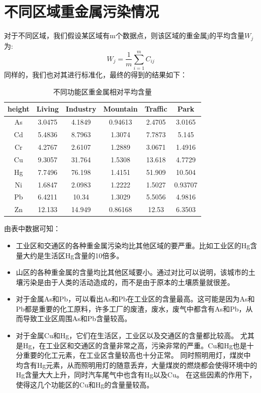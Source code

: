 \documentclass[a4paper]{article}
\begin{document}
\section{不同区域重金属污染情况}
对于不同区域，我们假设某区域有m个数据点，则该区域的重金属j的平均含量$W_j$为:
\begin{equation}
W_j=\frac{1}{m}\sum_{i=1}^m C_{ij}
\end{equation}
\indent 同样的，我们也对其进行标准化，最终的得到的结果如下：
\begin{table}[H]
		\centering
		\caption{不同功能区重金属相对平均含量}
		\label{average-contend}
		\begin{tabular}{c|ccccc}
		\hline
			height	  &    Living  &  Industry  &  Mountain  &  Traffic  &   Park    \\
			\hline
			As   & 3.0475  &  4.1849   &   0.94613   &  2.4705   &   3.0165      \\
    			Cd   & 5.4836  &  8.7963   &    1.3074   &  7.7873   &    5.145		\\
    			Cr   & 4.2767  &  2.6107   &    1.2889   &  3.0671   &   1.4916		\\
    			Cu   & 9.3057  &  31.764   &    1.5308   &  13.618   &   4.7729		\\
    			Hg   & 7.7496  &  76.198   &    1.4151   &  51.909   &   10.504		\\
    			Ni   & 1.6847  &  2.0983   &    1.2222   &  1.5027   &  0.93707		\\
    			Pb   & 6.4211  &   10.34   &    1.3029   &  5.5056   &   4.9816		\\
    			Zn   & 12.133  &  14.949   &   0.86168   &   12.53   &   6.3503		\\
    			\hline
		\end{tabular}
	\end{table}
由表中数据可知： 
\begin{itemize}
\item 工业区和交通区的各种重金属污染均比其他区域的要严重。比如工业区的Hg含量大约是生活区Hg含量的10倍多。                               
\item 山区的各种重金属的含量均比其他区域要小。通过对比可以说明，该城市的土壤污染是由于人类的活动造成的，而不是由于原本的土壤质量就很差。  
\item 对于金属As和Pb，可以看出As和Pb在工业区的含量最高。这可能是因为As和Pb都是重要的化工原料，许多工厂的废渣，废水，废气中都含有As和Pb，从而导致工业区周围As和Pb含量较高。
\item 对于金属Cu和Hg，它们在生活区，工业区以及交通区的含量都比较高。
尤其是Hg，在工业区和交通区的含量非常之高，污染非常的严重。Cu和Hg也是十分重要的化工元素，在工业区含量较高也十分正常。
同时照明用灯，煤炭中均含有Hg元素，从而照明用灯的随意丢弃，大量煤炭的燃烧都会使得环境中的Hg含量大大上升，同时汽车尾气中也含有Hg以及Cu。
在这些因素的作用下，使得这几个功能区的Cu和Hg的含量量较高。
\end{itemize}
\end{document}
